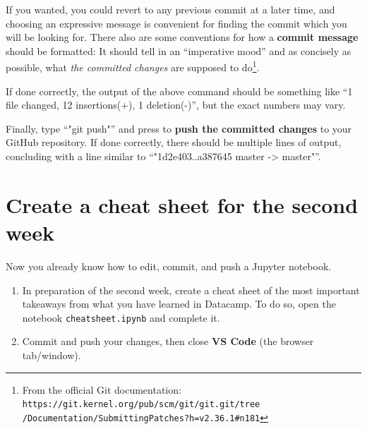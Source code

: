 \documentclass[12pt,a4paper]{article}
\begin{document}
If you wanted, you could revert to any previous commit at a later time, and choosing an expressive message is convenient for finding the commit which you will be looking for. There also are some conventions for how a \textbf{commit message} should be formatted: It should tell in an ``imperative mood'' and as concisely as possible, what \emph{the committed changes} are supposed to do\footnote{From the official Git documentation: \texttt{https://git.kernel.org/pub/scm/git/git.git/tree\\/Documentation/SubmittingPatches?h=v2.36.1\#n181}}.

If done correctly, the output of the above command should be something like ``1 file changed, 12 insertions(+), 1 deletion(-)'', but the exact numbers may vary.

Finally, type ``"git push"'' and press \Return to \textbf{push the committed changes} to your GitHub repository. If done correctly, there should be multiple lines of output, concluding with a line similar to ``"1d2e403..a387645 master -> master"''.

\section{Create a cheat sheet for the second week}
Now you already know how to edit, commit, and push a Jupyter notebook.
\begin{enumerate}
    \item In preparation of the second week, create a cheat sheet of the most important takeaways from what you have learned in Datacamp. To do so, open the notebook \texttt{cheatsheet.ipynb} and complete it.
    \item Commit and push your changes, then close \textbf{VS Code} (the browser tab/window).
\end{enumerate}
\end{document}
